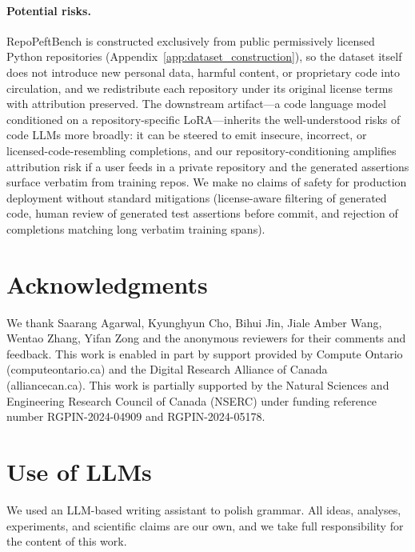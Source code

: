 \documentclass{llmxive}
\providecommand{\repopeftbench}{RepoPeftBench\xspace}
\begin{document}
\paragraph{Potential risks.}
\repopeftbench{} is constructed exclusively from public permissively licensed Python repositories (Appendix~\ref{app:dataset_construction}), so the dataset itself does not introduce new personal data, harmful content, or proprietary code into circulation, and we redistribute each repository under its original license terms with attribution preserved.
The downstream artifact---a code language model conditioned on a repository-specific LoRA---inherits the well-understood risks of code LLMs more broadly: it can be steered to emit insecure, incorrect, or licensed-code-resembling completions, and our repository-conditioning amplifies attribution risk if a user feeds in a private repository and the generated assertions surface verbatim from training repos.
We make no claims of safety for production deployment without standard mitigations (license-aware filtering of generated code, human review of generated test assertions before commit, and rejection of completions matching long verbatim training spans).





\section*{Acknowledgments}
We thank Saarang Agarwal, Kyunghyun Cho, Bihui Jin, Jiale Amber Wang, Wentao Zhang, Yifan Zong
and the anonymous reviewers for their comments and feedback.
This work is enabled in part by support provided by Compute Ontario (computeontario.ca) and the Digital Research Alliance of Canada (alliancecan.ca).
This work is partially supported by the Natural Sciences and Engineering Research Council of Canada (NSERC) under funding reference number RGPIN-2024-04909 and RGPIN-2024-05178.






\appendix

\section{Use of LLMs}
\label{app:llms}
We used an LLM-based writing assistant to polish grammar. All ideas, analyses, experiments, and scientific claims are our own, and we take full responsibility for the content of this work.
\end{document}

